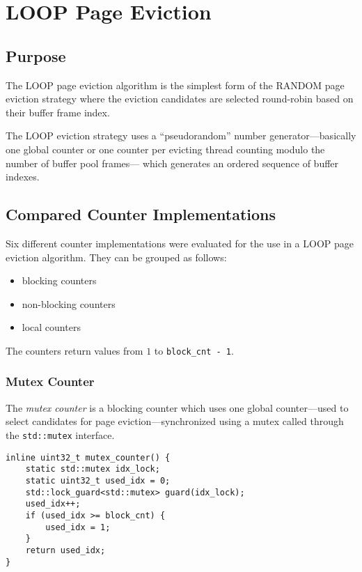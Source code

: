 \chapter[LOOP Page Eviction]{LOOP Page Eviction} \label{ch:loop}

\section[Purpose]{Purpose}

    The LOOP page eviction algorithm is the simplest form of the RANDOM page eviction strategy where the eviction candidates are selected round-robin based on their buffer frame index.

    The LOOP eviction strategy uses a ``pseudorandom'' number generator---basically one global counter or one counter per evicting thread counting modulo the number of buffer pool frames--- which generates an ordered sequence of buffer indexes.

\section[Compared Counter Implementations]{Compared Counter Implementations}

    Six different counter implementations were evaluated for the use in a LOOP page eviction algorithm. They can be grouped as follows:

\begin{@empty}
    \begin{itemize}
        \itemsep0em
        \item blocking counters
        \item non-blocking counters
        \item local counters
    \end{itemize}
\end{@empty}

    The counters return values from $1$ to \lstinline{block_cnt - 1}.

\subsection[Mutex Counter]{Mutex Counter} \label{subsec:mutex_counter}

    The \emph{mutex counter} is a blocking counter which uses one global counter---used to select candidates for page eviction---synchronized using a mutex called through the \lstinline{std::mutex} interface.

\begin{@empty}
    \lstset{
        language = [ISO]C++,
        style = basic
    }
    \begin{lstlisting}
inline uint32_t mutex_counter() {
    static std::mutex idx_lock;
    static uint32_t used_idx = 0;
    std::lock_guard<std::mutex> guard(idx_lock);
    used_idx++;
    if (used_idx >= block_cnt) {
        used_idx = 1;
    }
    return used_idx;
}
    \end{lstlisting}
\end{@empty}


